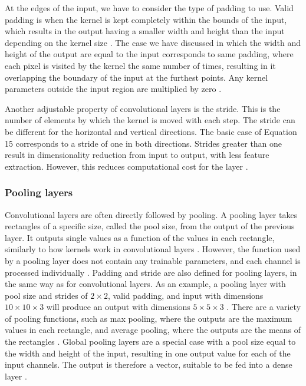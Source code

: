 \documentclass[12pt]{article}
\begin{document}
At the edges of the input, we have to consider the type of padding to use. Valid padding is when the kernel is kept completely within the bounds of the input, which results in the output having a smaller width and height than the input depending on the kernel size \cite{Aghdam17, Goodfellow16}. The case we have discussed in which the width and height of the output are equal to the input corresponds to same padding, where each pixel is visited by the kernel the same number of times, resulting in it overlapping the boundary of the input at the furthest points. Any kernel parameters outside the input region are multiplied by zero \cite{Aghdam17, Goodfellow16}.

Another adjustable property of convolutional layers is the stride. This is the number of elements by which the kernel is moved with each step. The stride can be different for the horizontal and vertical directions. The basic case of Equation 15 corresponds to a stride of one in both directions. Strides greater than one result in dimensionality reduction from input to output, with less feature extraction. However, this reduces computational cost for the layer \cite{Aghdam17, Goodfellow16}.

\subsubsection{Pooling layers}
Convolutional layers are often directly followed by pooling. A pooling layer takes rectangles of a specific size, called the pool size, from the output of the previous layer. It outputs single values as a function of the values in each rectangle, similarly to how kernels work in convolutional layers \cite{Aghdam17, Goodfellow16}. However, the function used by a pooling layer does not contain any trainable parameters, and each channel is processed individually \cite{Aghdam17, Goodfellow16}. Padding and stride are also defined for pooling layers, in the same way as for convolutional layers. As an example, a pooling layer with pool size and strides of $2 \times 2$, valid padding, and input with dimensions $10 \times 10 \times 3$ will produce an output with dimensions $5 \times 5 \times 3$ \cite{Aghdam17, Goodfellow16}. There are a variety of pooling functions, such as max pooling, where the outputs are the maximum values in each rectangle, and average pooling, where the outputs are the means of the rectangles \cite{Goodfellow16}. Global pooling layers are a special case with a pool size equal to the width and height of the input, resulting in one output value for each of the input channels. The output is therefore a vector, suitable to be fed into a dense layer \cite{Aghdam17}.
\end{document}
